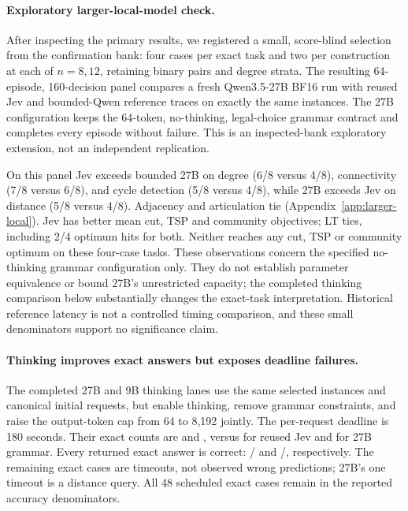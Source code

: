 \paragraph{Exploratory larger-local-model check.}
After inspecting the primary results, we registered a small, score-blind
selection from the confirmation bank: four cases per exact task and two per
construction at each of $n=8,12$, retaining binary pairs and degree strata.
The resulting 64-episode, 160-decision panel compares a fresh Qwen3.5-27B
BF16 run with reused Jev and bounded-Qwen reference traces on exactly the
same instances. The 27B configuration keeps the 64-token, no-thinking,
legal-choice grammar contract and completes every episode without failure.
This is an inspected-bank exploratory extension, not an independent replication.

On this panel Jev exceeds bounded 27B on degree (6/8 versus 4/8), connectivity
(7/8 versus 6/8), and cycle detection (5/8 versus 4/8), while 27B exceeds Jev
on distance (5/8 versus 4/8). Adjacency and articulation tie
(Appendix~\ref{app:larger-local}). Jev has better mean cut, TSP and community
objectives; LT ties, including 2/4 optimum hits for both. Neither reaches
any cut, TSP or community optimum on these four-case tasks.
These observations concern the specified no-thinking grammar configuration
only. They do not establish parameter equivalence or bound 27B's unrestricted
capacity; the completed thinking comparison below substantially changes the
exact-task interpretation. Historical reference latency is not a controlled
timing comparison, and these small denominators support no significance claim.

\paragraph{Thinking improves exact answers but exposes deadline failures.}
The completed 27B and 9B thinking lanes use the same selected instances and
canonical initial requests, but enable thinking, remove grammar constraints,
and raise the output-token cap from 64 to 8,192 jointly. The per-request
deadline is 180 seconds. Their exact counts are \EPLargeThinkingExact{} and
\EPSmallThinkingExact{}, versus \EPJevExact{} for reused Jev and
\EPGrammarExact{} for 27B grammar. Every returned exact answer is correct:
\EPLargeThinkingReturned/\EPLargeThinkingReturned{} and
\EPSmallThinkingReturned/\EPSmallThinkingReturned{}, respectively. The
remaining exact cases are timeouts, not observed wrong predictions; 27B's
one timeout is a distance query. All 48 scheduled exact cases remain in
the reported accuracy denominators.

